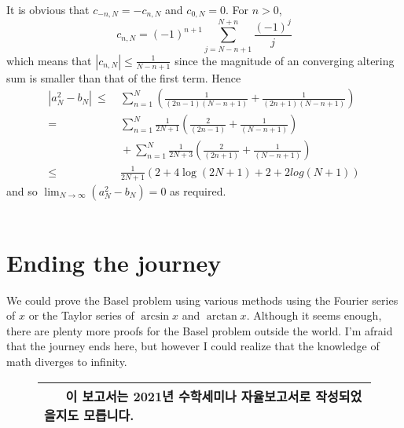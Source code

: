 It is obvious that $c_{-n,N}=-c_{n,N}$ and $c_{0,N}=0$. For $n > 0$,
\[
    c_{n,N}=(-1)^{n+1}\sum_{j=N-n+1}^{N+n}\frac{(-1)^j}{j}
\]
which means that $|c_{n,N}| \leq \frac{1}{N-n+1}$ since the magnitude of an converging altering sum is smaller than that of the first term. Hence
\begin{equation}
\begin{split}
|a_N^2-b_N| ~\leq{}& ~\sum_{n=1}^N(\frac{1}{(2n-1)(N-n+1)} + \frac{1}{(2n+1)(N-n+1)})\\
={}& ~\sum_{n=1}^N\frac{1}{2N+1}(\frac{2}{(2n-1)} + \frac{1}{(N-n+1)})\\
{}& ~+ \sum_{n=1}^N\frac{1}{2N+3}(\frac{2}{(2n+1)} + \frac{1}{(N-n+1)})\\
\leq{}& ~\frac{1}{2N+1}(2+4\log(2N+1)+2+2log(N+1)) \nonumber
\end{split}
\end{equation}
and so $\lim_{N\rightarrow\infty}(a_N^2-b_N)=0$ as required.~\\\\

\section*{Ending the journey}
We could prove the Basel problem using various methods using the Fourier series of $x$ or the Taylor series of $\arcsin x$ and $\arctan x$. Although it seems enough, there are plenty more proofs for the Basel problem outside the world. I'm afraid that the journey ends here, but however I could realize that the knowledge of math diverges to infinity.~\\


\vspace{4.5cm}
\begin{figure}[H]
\begin{table}[H]
\begin{center}
\begin{tabular}{l}
\hline
\textbf{~~~이 보고서는 2021년 수학세미나 자율보고서로 작성되었을지도 모릅니다.~~~}\\
\hline
\end{tabular}
\end{center}
\end{table}
\end{figure}
